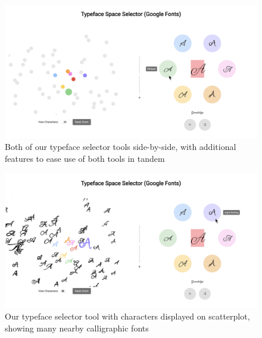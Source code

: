 \begin{figure}[p]
    \centering
    \includegraphics[width=\textwidth]{images/both-selectors.png}
    \caption{Both of our typeface selector tools side-by-side, with additional features to ease use of both tools in tandem}
    \label{fig:both-selectors}
\end{figure}

\begin{figure}[p]
    \centering
    \includegraphics[width=\textwidth]{images/tool-with-chars.png}
    \caption{Our typeface selector tool with characters displayed on scatterplot, showing many nearby calligraphic fonts}
    \label{fig:tool-with-chars}
\end{figure}

